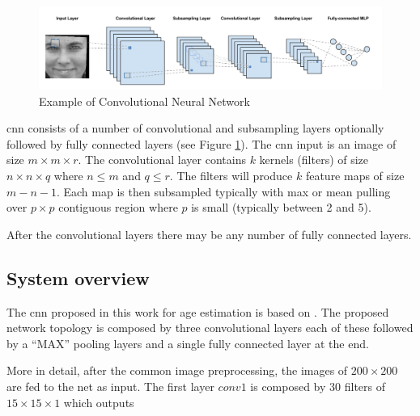 \begin{figure}[!h]
	\centering
	\includegraphics[width=\textwidth]{figures/CNN_sample}
	\caption{Example of Convolutional Neural Network}
	\label{fig:cnnSample}
\end{figure}

\gls{cnn} consists of a number of convolutional and subsampling layers optionally followed by fully connected layers (see Figure \ref{fig:cnnSample}). The \gls{cnn} input is an image of size $m\times m\times r$. The convolutional layer contains $k$ kernels (filters) of size $n\times n\times q$ where $n \leq m$ and $q \leq r$. The filters will produce $k$ feature maps of size $m - n - 1 $. Each map is then subsampled typically with max or mean pulling over $p\times p$ contiguous region where $p$ is small (typically between 2 and 5).

After the convolutional layers there may be any number of fully connected layers.

\subsection{System overview}

The \gls{cnn} proposed in this work for age estimation is based on \cite{yiage} \cite{yan2014}. The proposed network topology is composed by three convolutional layers each of these followed by a ``MAX'' pooling layers and a single fully connected layer at the end.

More in detail, after the common image preprocessing, the images of $200\times 200$ are fed to the net as input. The first layer $conv1$ is composed by 30 filters of $15\times 15\times 1$ which outputs 








